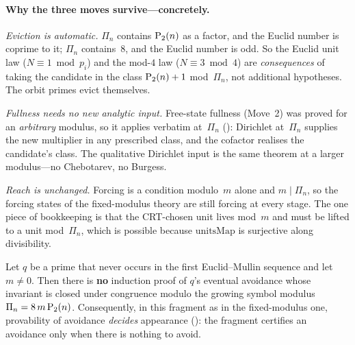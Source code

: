 \paragraph{Why the three moves survive---concretely.}
\emph{Eviction is automatic.}  $\Pi_n$ contains $\mathrm{P}_{2}(n)$ as a
factor, and the Euclid number is coprime to it; $\Pi_n$ contains~$8$,
and the Euclid number is odd.  So the Euclid unit law
($N \equiv 1 \bmod p_i$) and the mod-$4$ law ($N \equiv 3 \bmod 4$) are
\emph{consequences} of taking the candidate in the class
$\mathrm{P}_{2}(n)+1$ mod~$\Pi_n$, not additional hypotheses.  The orbit
primes evict themselves.

\emph{Fullness needs no new analytic input.}  Free-state fullness
(Move~2) was proved for an \emph{arbitrary} modulus, so it applies
verbatim at~$\Pi_n$
():
Dirichlet at~$\Pi_n$ supplies the new multiplier in any prescribed
class, and the cofactor realises the candidate's class.  The
qualitative Dirichlet input is the same theorem at a larger modulus---no
Chebotarev, no Burgess.

\emph{Reach is unchanged.}  Forcing is a condition modulo~$m$ alone and
$m \mid \Pi_n$, so the forcing states of the fixed-modulus theory are
still forcing at every stage.  The one piece of bookkeeping is that the
CRT-chosen unit lives mod~$m$ and must be lifted to a unit mod~$\Pi_n$,
which is possible because $\mathrm{unitsMap}$ is surjective along
divisibility.

\begin{theorem}
\label{thm:no-reciprocity-invariant}
Let $q$ be a prime that never occurs in the first Euclid--Mullin
sequence and let $m \neq 0$.  Then there is \textbf{no} induction proof
of $q$'s eventual avoidance whose invariant is closed under congruence
modulo the growing symbol modulus $\Pi_n = 8\,m\,\mathrm{P}_{2}(n)$.
Consequently, in this fragment as in the fixed-modulus one, provability
of avoidance \emph{decides} appearance
():
the fragment certifies an avoidance only when there is nothing to avoid.
\end{theorem}

